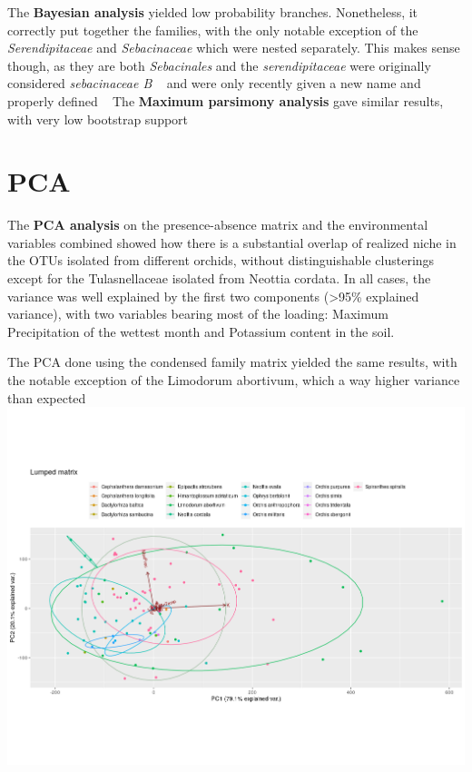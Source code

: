 The \textbf{Bayesian analysis} yielded low probability branches. Nonetheless, it correctly put together the families, with the only notable exception of the \emph{Serendipitaceae} and \emph{Sebacinaceae} which were nested separately. This makes sense though, as they are both \emph{Sebacinales} and the \emph{serendipitaceae} were originally considered \emph{sebacinaceae B} ~\citep{weiss2004} and were only recently given a new name and properly defined ~\citep{weiss2016}
The \textbf{Maximum parsimony analysis} gave similar results, with very low bootstrap support

\chapter{PCA}
\label{pca}

The \textbf{PCA analysis} on the presence-absence matrix and the environmental variables combined showed how there is a substantial overlap of realized niche in the OTUs isolated from different orchids, without distinguishable clusterings except for the Tulasnellaceae isolated from Neottia cordata.
In all cases, the variance was well explained by the first two components (>95\% explained variance), with two variables bearing most of the loading: Maximum Precipitation of the wettest month and Potassium content in the soil.

The PCA done using the condensed family matrix yielded the same results, with the notable exception of the Limodorum abortivum, which a way higher variance than expected \includegraphics[keepaspectratio,width=\textwidth,height=0.75\textheight]{images/lumpPCA.png}

